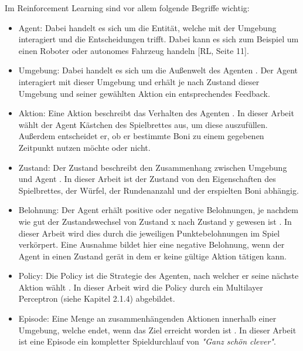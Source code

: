 Im Reinforcement Learning sind vor allem folgende Begriffe wichtig:

\begin{itemize}
\item Agent: Dabei handelt es sich um die Entität, welche mit der Umgebung interagiert und die Entscheidungen trifft. Dabei kann es sich zum Beispiel um einen Roboter oder autonomes Fahrzeug handeln [RL, Seite 11].

\item Umgebung: Dabei handelt es sich um die Außenwelt des Agenten \cite[Seite 11]{ris-ala_fundamentals_2023}. Der Agent interagiert mit dieser Umgebung und erhält je nach Zustand dieser Umgebung und seiner gewählten Aktion ein entsprechendes Feedback.

\item Aktion: Eine Aktion beschreibt das Verhalten des Agenten \cite[Seite 11]{ris-ala_fundamentals_2023}. In dieser Arbeit wählt der Agent Kästchen des Spielbrettes aus, um diese auszufüllen. Außerdem entscheidet er, ob er bestimmte Boni zu einem gegebenen Zeitpunkt nutzen möchte oder nicht.

\item Zustand: Der Zustand beschreibt den Zusammenhang zwischen Umgebung und Agent \cite[Seite 11]{ris-ala_fundamentals_2023}. In dieser Arbeit ist der Zustand von den Eigenschaften des Spielbrettes, der Würfel, der Rundenanzahl und der erspielten Boni abhängig.

\item Belohnung: Der Agent erhält positive oder negative Belohnungen, je nachdem wie gut der Zustandswechsel von Zustand x nach Zustand y gewesen ist \cite[Seite 11]{ris-ala_fundamentals_2023}. In dieser Arbeit wird dies durch die jeweiligen Punktebelohnungen im Spiel verkörpert. Eine Ausnahme bildet hier eine negative Belohnung, wenn der Agent in einen Zustand gerät in dem er keine gültige Aktion tätigen kann.

\item Policy: Die Policy ist die Strategie des Agenten, nach welcher er seine nächste Aktion wählt \cite[Seite 11]{ris-ala_fundamentals_2023}. In dieser Arbeit wird die Policy durch ein Multilayer Perceptron (siehe Kapitel 2.1.4) abgebildet.

\item Episode: Eine Menge an zusammenhängenden Aktionen innerhalb einer Umgebung, welche endet, wenn das Ziel erreicht worden ist \cite[Seite 11]{ris-ala_fundamentals_2023}. In dieser Arbeit ist eine Episode ein kompletter Spieldurchlauf von \textit{"Ganz schön clever"}.
\end{itemize}

